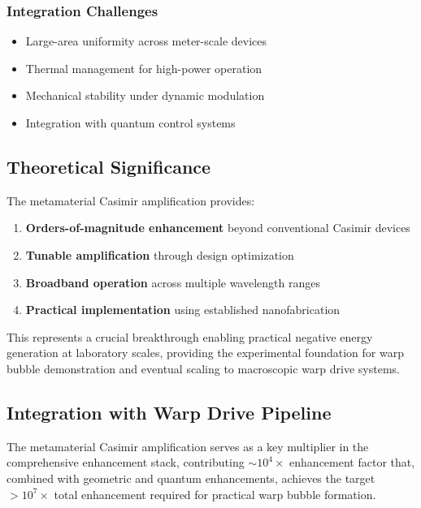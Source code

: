 \subsubsection{Integration Challenges}

\begin{itemize}
\item Large-area uniformity across meter-scale devices
\item Thermal management for high-power operation
\item Mechanical stability under dynamic modulation
\item Integration with quantum control systems
\end{itemize}

\subsection{Theoretical Significance}

The metamaterial Casimir amplification provides:

\begin{enumerate}
\item \textbf{Orders-of-magnitude enhancement} beyond conventional Casimir devices
\item \textbf{Tunable amplification} through design optimization
\item \textbf{Broadband operation} across multiple wavelength ranges
\item \textbf{Practical implementation} using established nanofabrication
\end{enumerate}

This represents a crucial breakthrough enabling practical negative energy generation at laboratory scales, providing the experimental foundation for warp bubble demonstration and eventual scaling to macroscopic warp drive systems.

\subsection{Integration with Warp Drive Pipeline}

The metamaterial Casimir amplification serves as a key multiplier in the comprehensive enhancement stack, contributing $\sim 10^4\times$ enhancement factor that, combined with geometric and quantum enhancements, achieves the target $> 10^7\times$ total enhancement required for practical warp bubble formation.
